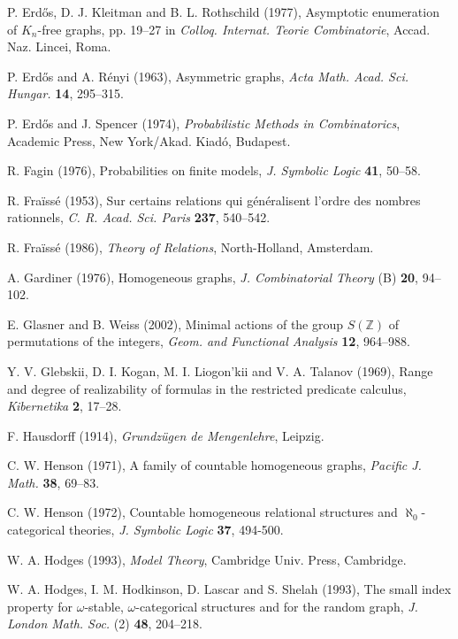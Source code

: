 \documentclass{book}
\begin{document}
\begin{thebibliography}{99}
P. Erd\H{o}s, D. J. Kleitman and B. L. Rothschild (1977),
Asymptotic enumeration of $K_n$-free graphs,
pp. 19--27 in \textit{Colloq. Internat. Teorie Combinatorie},
Accad. Naz. Lincei, Roma.

P. Erd\H{o}s and A. R\'{e}nyi (1963),
Asymmetric graphs,
\textit{Acta Math. Acad. Sci. Hungar.} \textbf{14}, 295--315.

P. Erd\H{o}s and J. Spencer (1974),
\textit{Probabilistic Methods in Combinatorics},
Academic Press, New York/Akad. Kiad\'{o}, Budapest.

 R. Fagin (1976),
Probabilities on finite models,
\textit{J. Symbolic Logic} \textbf{41}, 50--58.

R. Fra\"{i}ss\'{e} (1953),
Sur certains relations qui g\'{e}n\'{e}ralisent l'ordre des nombres
rationnels,
\textit{C. R. Acad. Sci. Paris} \textbf{237}, 540--542.

R. Fra\"{i}ss\'{e} (1986),
\textit{Theory of Relations}, North-Holland, Amsterdam.

A. Gardiner (1976),
Homogeneous graphs,
\textit{J. Combinatorial Theory} (B) \textbf{20}, 94--102.

E. Glasner and B. Weiss (2002),
Minimal actions of the group $S(\mathbb{Z})$ of permutations of the integers,
\textit{Geom. and Functional Analysis} \textbf{12}, 964--988.

Y. V. Glebskii, D. I. Kogan, M. I. Liogon'kii and V. A. Talanov (1969),
Range and degree of realizability of formulas in the restricted predicate
calculus,
\textit{Kibernetika} \textbf{2}, 17--28.

F. Hausdorff (1914),
\textit{Grundz\"{u}gen de Mengenlehre}, Leipzig.

C. W. Henson (1971),
A family of countable homogeneous graphs,
\textit{Pacific J. Math.} \textbf{38}, 69--83.

C. W. Henson (1972),
Countable homogeneous relational structures and $\aleph_0$-categorical theories,
\textit{J. Symbolic Logic} \textbf{37}, 494-500.

W. A. Hodges (1993),
\textit{Model Theory},
Cambridge Univ. Press, Cambridge.

W. A. Hodges, I. M. Hodkinson, D. Lascar and S. Shelah (1993),
The small index property for $\omega$-stable, $\omega$-categorical structures
and for the random graph,
\textit{J. London Math. Soc.} (2) \textbf{48}, 204--218.


\end{thebibliography}
\end{document}

